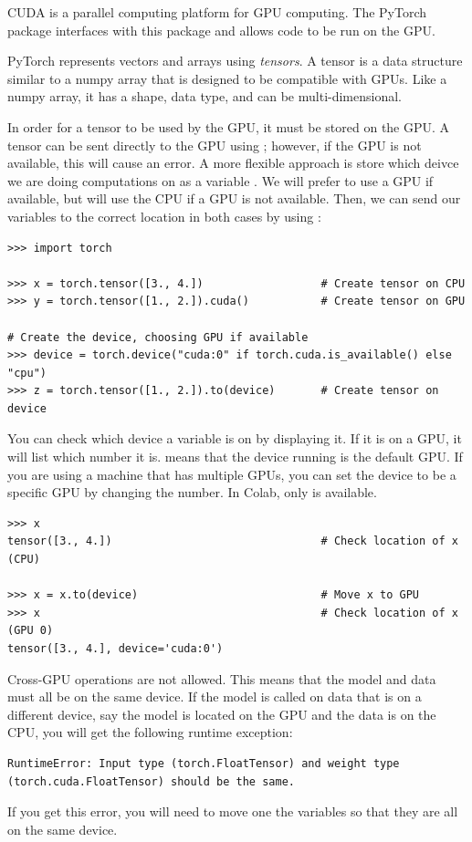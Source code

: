 CUDA is a parallel computing platform %
 for GPU computing.
 The PyTorch package  interfaces with this package and allows code to be run on the GPU.
 
PyTorch represents vectors and arrays using \emph{tensors}.
A tensor is a data structure similar to a numpy array that is designed to be compatible with GPUs.
Like a numpy array, it has a shape, data type, and can be multi-dimensional.

In order for a tensor to be used by the GPU, it must be stored on the GPU.
A tensor can be sent directly to the GPU using ; however, if the GPU is not available, this will cause an error.
A more flexible approach is store which deivce we are doing computations on as a variable .
We will prefer to use a GPU if available, but will use the CPU if a GPU is not available.
Then, we can send our variables to the correct location in both cases by using :

\begin{lstlisting}
>>> import torch

>>> x = torch.tensor([3., 4.])					# Create tensor on CPU
>>> y = torch.tensor([1., 2.]).cuda()			# Create tensor on GPU

# Create the device, choosing GPU if available
>>> device = torch.device("cuda:0" if torch.cuda.is_available() else "cpu")
>>> z = torch.tensor([1., 2.]).to(device)		# Create tensor on device
\end{lstlisting}
You can check which device a variable is on by displaying it.
If it is on a GPU, it will list which number it is.
 means that the device running is the default GPU.
If you are using a machine that has multiple GPUs, you can set the device to be a specific GPU by changing the number. 
In Colab, only  is available.
\begin{lstlisting}
>>> x
tensor([3., 4.])								# Check location of x (CPU)

>>> x = x.to(device)							# Move x to GPU
>>> x											# Check location of x (GPU 0)
tensor([3., 4.], device='cuda:0')							
\end{lstlisting}

\begin{warn}
Cross-GPU operations are not allowed.
This means that the model and data must all be on the same device.
If the model is called on data that is on a different device, say the model is located on the GPU and the data is on the CPU, you will get the following runtime exception:
\begin{lstlisting}
RuntimeError: Input type (torch.FloatTensor) and weight type (torch.cuda.FloatTensor) should be the same.
\end{lstlisting}
If you get this error, you will need to move one the variables so that they are all on the same device.
\end{warn}

